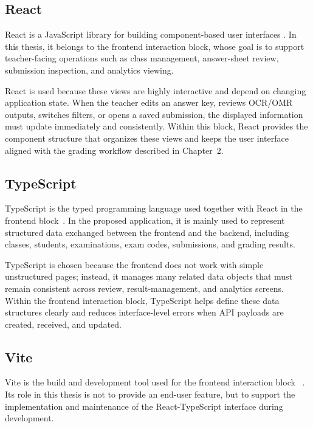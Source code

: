 \documentclass[../Main.tex]{subfiles}
\begin{document}
\subsection{React}
\label{subsection:3.2.1}

React is a JavaScript library for building component-based user interfaces
\cite{react2026}. In this thesis, it belongs to the frontend interaction block,
whose goal is to support teacher-facing operations such as class management,
answer-sheet review, submission inspection, and analytics viewing.

React is used because these views are highly interactive and depend on changing
application state. When the teacher edits an answer key, reviews OCR/OMR
outputs, switches filters, or opens a saved submission, the displayed
information must update immediately and consistently. Within this block, React
provides the component structure that organizes these views and keeps the user
interface aligned with the grading workflow described in Chapter~2.

\subsection{TypeScript}
\label{subsection:3.2.2}

TypeScript is the typed programming language used together with React in the
frontend block~\cite{typescript2026}. In the proposed application, it is mainly
used to represent structured data exchanged between the frontend and the
backend, including classes, students, examinations, exam codes, submissions,
and grading results.

TypeScript is chosen because the frontend does not work with simple unstructured
pages; instead, it manages many related data objects that must remain consistent
across review, result-management, and analytics screens. Within the frontend
interaction block, TypeScript helps define these data structures clearly and
reduces interface-level errors when API payloads are created, received, and
updated.

\subsection{Vite}
\label{subsection:3.2.3}

Vite is the build and development tool used for the frontend interaction block
~\cite{vite2026}. Its role in this thesis is not to provide an end-user feature,
but to support the implementation and maintenance of the React-TypeScript
interface during development.
\end{document}

